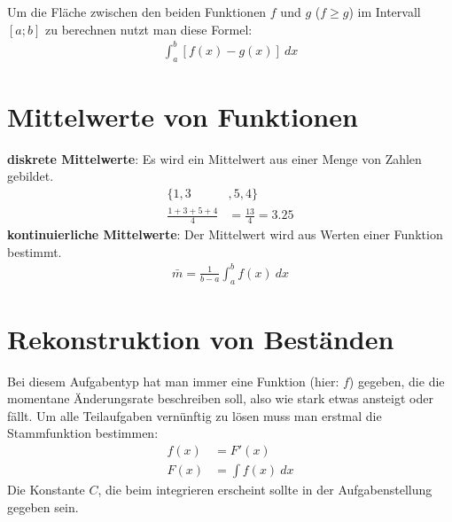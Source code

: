 \begin{flushleft}
    Um die Fläche zwischen den beiden Funktionen $f$ und $g$ ($f \geq g$) im Intervall $[a;b]$ zu berechnen nutzt man diese Formel:
    \begin{align}
        \int_{a}^{b} [f(x)-g(x)] \ dx
    \end{align}
\end{flushleft}

\section{Mittelwerte von Funktionen}

\begin{flushleft}
    \textbf{diskrete Mittelwerte}: \newline
    Es wird ein Mittelwert aus einer Menge von Zahlen gebildet. \newline
    \begin{align}
        \{1,3&,5,4\} \\
        \frac{1+3+5+4}{4}&=\frac{13}{4}=3.25
    \end{align}
    \newline
    \textbf{kontinuierliche Mittelwerte}: \newline
    Der Mittelwert wird aus Werten einer Funktion bestimmt. \newline
    \begin{align}
        \bar{m}=\frac{1}{b-a}\int_{a}^{b} f(x) \ dx
    \end{align}
\end{flushleft}

\section{Rekonstruktion von Beständen}

\begin{flushleft}
    Bei diesem Aufgabentyp hat man immer eine Funktion (hier: $f$) gegeben, die die momentane Änderungsrate beschreiben soll, also wie stark etwas ansteigt oder fällt. Um alle Teilaufgaben vernünftig zu lösen muss man erstmal die Stammfunktion bestimmen:
    \begin{align}
        f(x)&=F'(x) \\
        F(x)&=\int f(x) \ dx
    \end{align}
    Die Konstante $C$, die beim integrieren erscheint sollte in der Aufgabenstellung gegeben sein.
\end{flushleft}
